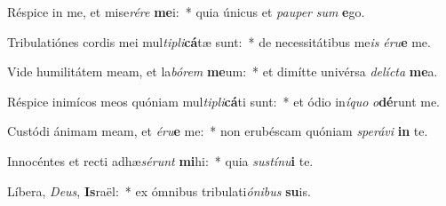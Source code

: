 \item Réspice in me, et mise\textit{ré}\textit{re} \textbf{me}i:~* quia únicus et \textit{pau}\textit{per} \textit{sum} \textbf{e}go.
\item Tribulatiónes cordis mei mul\textit{ti}\textit{pli}\textbf{cá}tæ sunt:~* de necessitátibus me\textit{is} \textit{é}\textit{ru}\textbf{e} me.
\item Vide humilitátem meam, et la\textit{bó}\textit{rem} \textbf{me}um:~* et dimítte univérsa \textit{de}\textit{líc}\textit{ta} \textbf{me}a.
\item Réspice inimícos meos quóniam mul\textit{ti}\textit{pli}\textbf{cá}ti sunt:~* et ódio in\textit{í}\textit{quo} \textit{o}\textbf{dé}runt me.
\item Custódi ánimam meam, et \textit{é}\textit{ru}\textbf{e} me:~* non erubéscam quóniam \textit{spe}\textit{rá}\textit{vi} \textbf{in} te.
\item Innocéntes et recti adhæ\textit{sé}\textit{runt} \textbf{mi}hi:~* quia \textit{sus}\textit{tí}\textit{nu}\textbf{i} te.
\item Líbera, \textit{De}\textit{us}, \textbf{Is}raël:~* ex ómnibus tribulati\textit{ó}\textit{ni}\textit{bus} \textbf{su}is.
